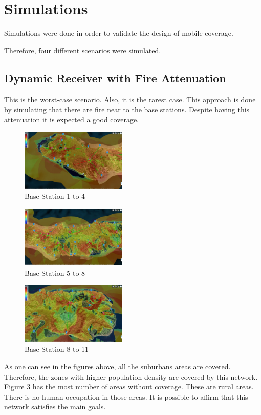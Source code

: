 \documentclass[letterpaper, 10 pt, conference]{ieeeconf}  %
\begin{document}
\section{Simulations}\noindent
Simulations were done in order to validate the design of mobile coverage.\par
\noindent Therefore, four different scenarios were simulated.
\subsection{Dynamic Receiver with Fire Attenuation}
\noindent This is the worst-case scenario. Also, it is the rarest case. This approach is done by simulating that there are fire near to the base stations. Despite having this attenuation it is expected a good coverage.
\begin{figure}[h!]
    \centering
    \includegraphics[width=0.45\textwidth]{estacaobase1a4.JPG}
    \caption{Base Station 1 to 4}
    \label{fig:estacoesbase1a4}
\end{figure}
\begin{figure}[h!]
    \centering
    \includegraphics[width=0.45\textwidth]{estacaobase5a8.JPG}
    \caption{Base Station 5 to 8}
    \label{fig:estacoesbase5a8}
\end{figure}
\begin{figure}[!h]
    \centering
    \includegraphics[width=0.45\textwidth]{estacaobase9a11.JPG}
    \caption{Base Station 8 to 11}
    \label{fig:estacoesbase9a11}
\end{figure}
\FloatBarrier 
\noindent As one can see in the figures above, all the suburbans areas are covered. Therefore, the zones with higher population density are covered by this network. Figure \ref{fig:estacoesbase9a11} has the most number of areas without coverage. These are rural areas. There is no human occupation in those areas. It is possible to affirm that this network satisfies the main goals.
\end{document}
